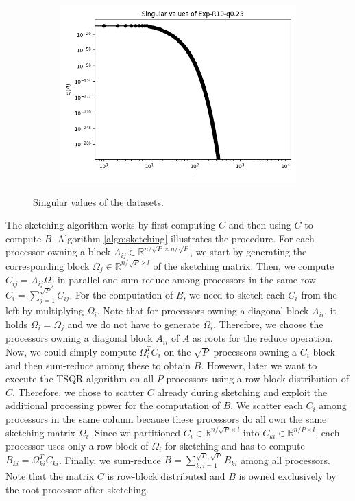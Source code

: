 \documentclass{article}
\theoremstyle{definition}
\begin{document}
\begin{figure}
\begin{subfigure}[t]{\textwidth+20pt\relax}
    \includegraphics[width=\dimexpr\linewidth-20pt\relax]
        {../plots/singular_values/singular_values_Exp-R10-q0.25.png}
\end{subfigure}
\caption{Singular values of the datasets.}
\label{fig:singularValue}
\end{figure}

The sketching algorithm works by first computing $C$ and then using $C$ to
compute $B$. Algorithm \ref{algo:sketching} illustrates the procedure. For each
processor owning a block $A_{ij} \in \mathbb{R}^{n/\!\sqrt{P} \times
n/\!\sqrt{P}}$, we start by generating the corresponding block $\Omega_j \in
\mathbb{R}^{n/\!\sqrt{P} \times l}$ of the sketching matrix. Then, we compute
$C_{ij} = A_{ij} \Omega_j$ in parallel and sum-reduce among processors in the
same row $C_i = \sum_{j = 1}^{\sqrt{P}} C_{ij}$. For the computation of $B$, we
need to sketch each $C_i$ from the left by multiplying $\Omega_i$. Note that for
processors owning a diagonal block $A_{ii}$, it holds $\Omega_i = \Omega_j$ and
we do not have to generate $\Omega_i$. Therefore, we choose the processors
owning a diagonal block $A_{ii}$ of $A$ as roots for the reduce operation. Now,
we could simply compute $\Omega_i^T C_i$ on the $\sqrt{P}$ processors owning a
$C_i$ block and then sum-reduce among these to obtain $B$. However, later we
want to execute the TSQR algorithm on all $P$ processors using a row-block
distribution of $C$. Therefore, we chose to scatter $C$ already during sketching
and exploit the additional processing power for the computation of $B$. We
scatter each $C_i$ among processors in the same column because these processors
do all own the same sketching matrix $\Omega_i$. Since we partitioned $C_i \in
\mathbb{R}^{n/\!\sqrt{P} \times l}$ into $C_{ki} \in \mathbb{R}^{n/P \times l}$,
each processor uses only a row-block of $\Omega_i$ for sketching and has to
compute $B_{ki} = \Omega_{ki}^T C_{ki}$. Finally, we sum-reduce $B = \sum_{k,i =
1}^{\sqrt{P}, \sqrt{P}} B_{ki}$ among all processors. Note that the matrix $C$
is row-block distributed and $B$ is owned exclusively by the root processor
after sketching.
\end{document}
